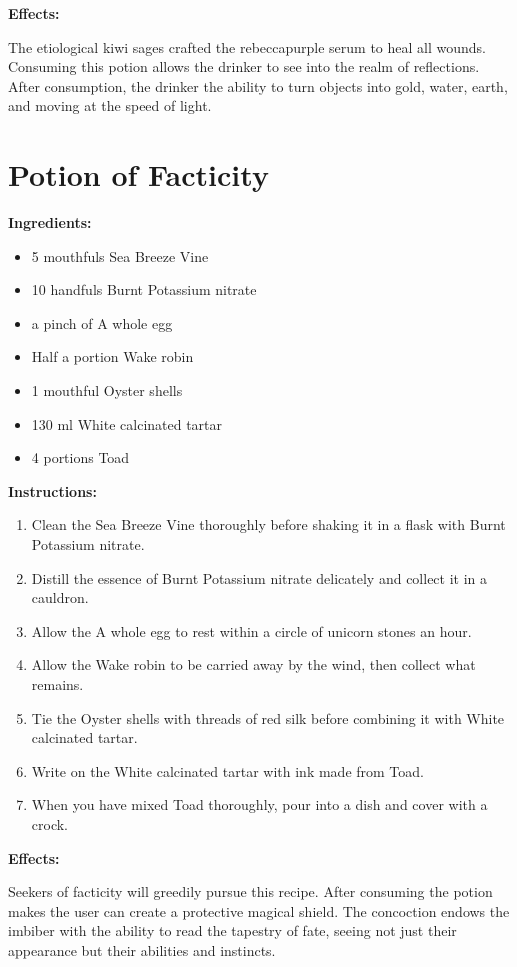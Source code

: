 \documentclass{article}
\begin{document}
\textbf{Effects:}

The etiological kiwi sages crafted the rebeccapurple serum to heal all wounds. Consuming this potion allows the drinker to see into the realm of reflections. After consumption, the drinker the ability to turn objects into gold, water, earth, and moving at the speed of light.

\newpage
\section*{Potion of Facticity}

\textbf{Ingredients:}

\begin{itemize}
  \item 5 mouthfuls Sea Breeze Vine
  \item 10 handfuls Burnt Potassium nitrate
  \item a pinch of A whole egg
  \item Half a portion Wake robin
  \item 1 mouthful Oyster shells
  \item 130 ml White calcinated tartar
  \item 4 portions Toad
\end{itemize}

\textbf{Instructions:}

\begin{enumerate}
  \item Clean the Sea Breeze Vine thoroughly before shaking it in a flask with Burnt Potassium nitrate.
  \item Distill the essence of Burnt Potassium nitrate delicately and collect it in a cauldron.
  \item Allow the A whole egg to rest within a circle of unicorn stones an hour.
  \item Allow the Wake robin to be carried away by the wind, then collect what remains.
  \item Tie the Oyster shells with threads of red silk before combining it with White calcinated tartar.
  \item Write on the White calcinated tartar with ink made from Toad.
  \item When you have mixed Toad thoroughly, pour into a dish and cover with a crock.
\end{enumerate}

\textbf{Effects:}

Seekers of facticity will greedily pursue this recipe. After consuming the potion makes the user can create a protective magical shield. The concoction endows the imbiber with the ability to read the tapestry of fate, seeing not just their appearance but their abilities and instincts.
\end{document}
